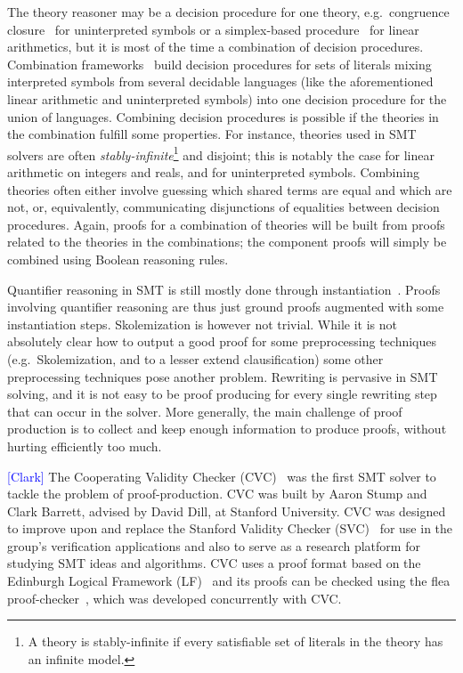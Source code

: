 \documentclass{llncs}
\newcommand{\Note}[1]{\textcolor{blue}{[#1]}}
\begin{document}
The theory reasoner may be a decision procedure for one theory, e.g.\ congruence
closure~\cite{Nelson2,Nieuwenhuis6} for uninterpreted symbols or a simplex-based
procedure~\cite{Dutertre1} for linear arithmetics, but it is most of the time a
combination of decision procedures.  Combination
frameworks~\cite{Nelson3,Tinelli1} build decision procedures for sets of
literals mixing interpreted symbols from several decidable languages (like the
aforementioned linear arithmetic and uninterpreted symbols) into one decision
procedure for the union of languages.  Combining decision procedures is possible
if the theories in the combination fulfill some properties.  For instance,
theories used in SMT solvers are often \emph{stably-infinite}\footnote{A theory
  is stably-infinite if every satisfiable set of literals in the theory has an
  infinite model.} and disjoint; this is notably the case for linear arithmetic
on integers and reals, and for uninterpreted symbols.  Combining theories often
either involve guessing which shared terms are equal and which are not, or,
equivalently, communicating disjunctions of equalities between decision
procedures.  Again, proofs for a combination of theories will be built from
proofs related to the theories in the combinations; the component proofs will
simply be combined using Boolean reasoning rules.

Quantifier reasoning in SMT is still mostly done through
instantiation~\cite{Moura9}.  Proofs involving quantifier reasoning are thus
just ground proofs augmented with some instantiation steps.  Skolemization is
however not trivial.  While it is not absolutely clear how to output a good
proof for some preprocessing techniques (e.g.\ Skolemization, and to a lesser
extend clausification) some other preprocessing techniques pose another problem.
Rewriting is pervasive in SMT solving, and it is not easy to be proof producing
for every single rewriting step that can occur in the solver.  More generally,
the main challenge of proof production is to collect and keep enough information
to produce proofs, without hurting efficiently too much.

\Note{Clark}
The Cooperating Validity Checker (CVC)~\cite{SBD02} was the first SMT solver to
tackle the problem of proof-production.  CVC was built by Aaron Stump and Clark
Barrett, advised by David Dill, at Stanford University.  CVC was designed to
improve upon and replace the Stanford Validity Checker (SVC)~\cite{BDL96} for
use in the group's verification applications and also to serve as a research
platform for studying SMT ideas and algorithms.    CVC
uses a proof format based on the Edinburgh Logical Framework (LF)~\cite{HHP93}
and its proofs can be checked using the flea proof-checker~\cite{SBD02b,SD02}, which was
developed concurrently with CVC.
\end{document}
